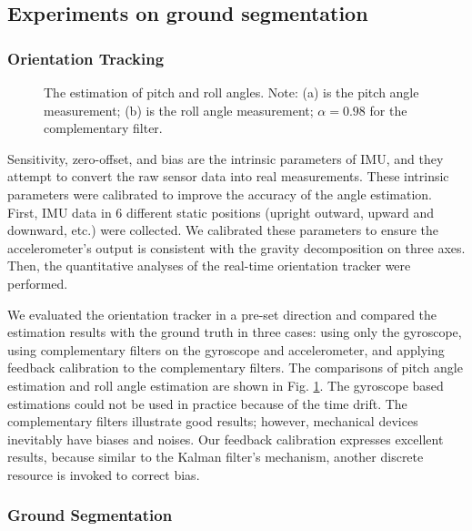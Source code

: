 \documentclass{ieeeaccess}
\begin{document}
\subsection{Experiments on ground segmentation}
\subsubsection{ Orientation Tracking}

\begin{figure}
    \centering
    \caption{The estimation of pitch and roll angles. Note: (a) is the pitch angle measurement; (b) is the roll angle measurement; $\alpha = 0.98$ for the complementary filter.}%
    \label{fig:anglestimation}
\end{figure}
Sensitivity, zero-offset, and bias are the intrinsic parameters of IMU, and they attempt to convert the raw sensor data into real measurements. These intrinsic parameters were calibrated to improve the accuracy of the angle estimation. First, IMU data in 6 different static positions (upright outward, upward and downward, etc.) were collected. We calibrated these parameters to ensure the accelerometer's output is consistent with the gravity decomposition on three axes. Then, the quantitative analyses of the real-time orientation tracker were performed. 

We evaluated the orientation tracker in a pre-set direction and compared the estimation results with the ground truth in three cases: using only the gyroscope, using complementary filters on the gyroscope and accelerometer, and applying feedback calibration to the complementary filters. The comparisons of pitch angle estimation and roll angle estimation are shown in Fig. \ref{fig:anglestimation}. The gyroscope based estimations could not be used in practice because of the time drift. The complementary filters illustrate good results; however, mechanical devices inevitably have biases and noises. Our feedback calibration expresses excellent results, because similar to the Kalman filter's mechanism, another discrete resource is invoked to correct bias. 


\subsubsection{Ground Segmentation}
\end{document}
